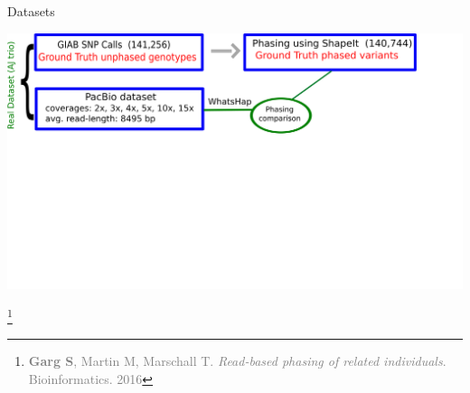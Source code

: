 \documentclass[notes=hide]{beamer}
\begin{document}
%
\begin{frame}{Datasets}
	\begin{center}
		\includegraphics[scale=0.1]{figs/flowdiagram1}
	\end{center}
\let\thefootnote\relax\footnote{\scriptsize\textcolor{gray}{\textbf{Garg S}, Martin M, Marschall T. \textit{Read-based phasing of related individuals}. Bioinformatics. 2016}}
\end{frame}
\end{document}
